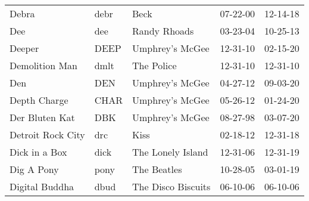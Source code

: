 \begin{longtable}{p{}p{}p{}p{}p{}}
                                                                   Debra &          debr &                                                     Beck &              07-22-00 &             12-14-18 \\
                                                                     Dee &           dee &                                             Randy Rhoads &              03-23-04 &             10-25-13 \\
                                                                  Deeper &          DEEP &                                          Umphrey's McGee &              12-31-10 &             02-15-20 \\
                                                          Demolition Man &          dmlt &                                               The Police &              12-31-10 &             12-31-10 \\
                                                                     Den &           DEN &                                          Umphrey's McGee &              04-27-12 &             09-03-20 \\
                                                            Depth Charge &          CHAR &                                          Umphrey's McGee &              05-26-12 &             01-24-20 \\
                                                          Der Bluten Kat &           DBK &                                          Umphrey's McGee &              08-27-98 &             03-07-20 \\
                                                       Detroit Rock City &           drc &                                                     Kiss &              02-18-12 &             12-31-18 \\
                                                           Dick in a Box &          dick &                                        The Lonely Island &              12-31-06 &             12-31-19 \\
                                                              Dig A Pony &          pony &                                              The Beatles &              10-28-05 &             03-01-19 \\
                                                          Digital Buddha &          dbud &                                       The Disco Biscuits &              06-10-06 &             06-10-06 \\

\end{longtable}
